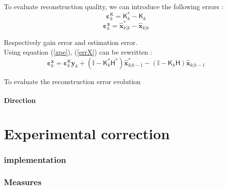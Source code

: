 \documentclass[titlepage]{article}
\renewcommand{\H}{\boldsymbol{\mathsf{H}}}
\newcommand{\K}{\boldsymbol{\mathsf{K}}}
\newcommand{\x}{\boldsymbol{x}}
\newcommand{\y}{\boldsymbol{y}}
\newcommand{\xp}{\widehat{\x}_{k|k-1}}
\newcommand{\xe}{\widehat{\x}_{k|k}}
\newcommand{\vbeps}{\boldsymbol{\varepsilon}}
\begin{document}
	To evaluate reconstruction quality, we can introduce the following errors :
	\begin{equation}
		\vbeps^{\K}_k = \K_k^* - \K_k
	\end{equation}
	\begin{equation}\label{errX}
		\vbeps^{\x}_k = \xe^* - \xe
	\end{equation}

	Respectively gain error and estimation error.\\
	Using equation (\ref{xpe}), (\ref{errX}) can be rewritten :
	\begin{equation}
		\vbeps^{\x}_k = \vbeps^{\K}_k\y_k + \left(\mathbb{I} - \K_k^*\H^*\right)\xp^* - \left(\mathbb{I} - \K_k\H\right)\xp
	\end{equation}

	To evaluate the reconstruction error evolution 
	
	\subsection{Direction}
	
	\newpage
	\part{Experimental correction}
	\section{implementation}
	\section{Measures}
	
	
	\newpage
	\printbibliography
\end{document}
